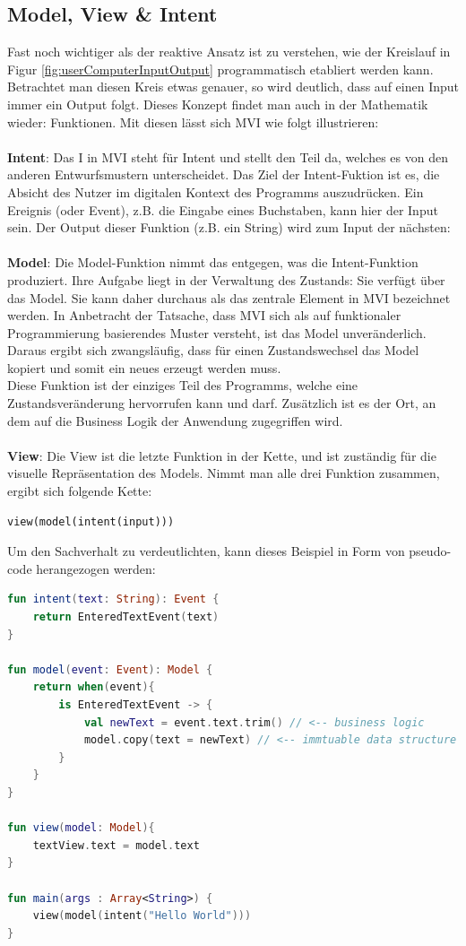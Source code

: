 \subsection{Model, View \& Intent}
Fast noch wichtiger als der reaktive Ansatz ist zu verstehen, wie der Kreislauf in Figur \ref{fig:userComputerInputOutput} 
programmatisch etabliert werden kann. Betrachtet man diesen Kreis etwas genauer, so wird deutlich, dass auf einen Input immer ein Output folgt. Dieses Konzept findet man auch in der Mathematik wieder: Funktionen. Mit diesen lässt sich MVI wie folgt illustrieren:
\\
\\
\textbf{Intent}: Das I in MVI steht für Intent und stellt den Teil da, welches es von den anderen Entwurfsmustern unterscheidet. Das Ziel der Intent-Fuktion ist es, die Absicht des Nutzer im digitalen Kontext des Programms auszudrücken.
Ein Ereignis (oder Event), z.B. die Eingabe eines Buchstaben, kann hier der Input sein.
Der Output dieser Funktion (z.B. ein String) wird zum Input der nächsten:
\\
\\
\textbf{Model}: Die Model-Funktion nimmt das entgegen, was die Intent-Funktion produziert. Ihre Aufgabe liegt in der Verwaltung des Zustands: Sie verfügt über das Model. Sie kann daher durchaus als das zentrale Element in MVI bezeichnet werden. In Anbetracht der Tatsache, dass MVI sich als auf funktionaler Programmierung basierendes Muster versteht, ist das Model unveränderlich. Daraus ergibt sich zwangsläufig, dass für einen Zustandswechsel das Model kopiert und somit ein neues erzeugt werden muss. 
\\
Diese Funktion ist der einziges Teil des Programms, welche eine Zustandsveränderung hervorrufen kann und darf. Zusätzlich ist es der Ort, an dem auf die Business Logik der Anwendung zugegriffen wird.
\\
\\
\textbf{View}: Die View ist die letzte Funktion in der Kette, und ist zuständig für die visuelle Repräsentation des Models.
\newpage
Nimmt man alle drei Funktion zusammen, ergibt sich folgende Kette:
\begin{lstlisting}[caption={funktion}, xleftmargin=.3\textwidth, frame=false, numbers=none]
view(model(intent(input)))
\end{lstlisting}
Um den Sachverhalt zu verdeutlichten, kann dieses Beispiel in Form von pseudo-code herangezogen werden:
\begin{lstlisting}[caption={pseudo mvi implementation}, label={lst:pseudo-mvi}, language=Kotlin]
fun intent(text: String): Event {
	return EnteredTextEvent(text)
}

fun model(event: Event): Model {
	return when(event){
		is EnteredTextEvent -> {
			val newText = event.text.trim() // <-- business logic
			model.copy(text = newText) // <-- immtuable data structure
		}
	}
}

fun view(model: Model){
	textView.text = model.text 	
}

fun main(args : Array<String>) {
	view(model(intent("Hello World")))
}
\end{lstlisting}
